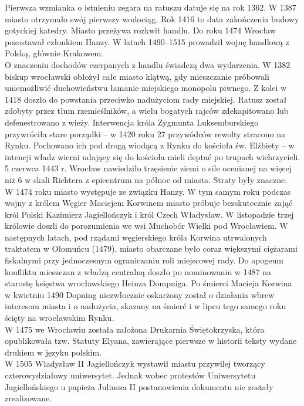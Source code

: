 \documentclass{article}
\begin{document}
Pierwsza wzmianka o istnieniu zegara na ratuszu datuje się na rok 1362. W 1387 miasto otrzymało swój pierwszy wodociąg. Rok 1416 to data zakończenia budowy gotyckiej katedry. Miasto przeżywa rozkwit handlu. Do roku 1474 Wrocław pozostawał członkiem Hanzy. W latach 1490–1515 prowadził wojnę handlową z Polską, głównie Krakowem.\\
O znaczeniu dochodów czerpanych z handlu świadczą dwa wydarzenia. W 1382 biskup wrocławski obłożył całe miasto klątwą, gdy mieszczanie próbowali uniemożliwić duchowieństwu łamanie miejskiego monopolu piwnego. Z kolei w 1418 doszło do powstania przeciwko nadużyciom rady miejskiej. Ratusz został zdobyty przez tłum rzemieślników, a wielu bogatych rajców zdekapitowano lub defenestrowano z wieży. Interwencja króla Zygmunta Luksemburskiego przywróciła stare porządki – w 1420 roku 27 przywódców rewolty stracono na Rynku. Pochowano ich pod drogą wiodącą z Rynku do kościoła św. Elżbiety – w intencji władz wierni udający się do kościoła mieli deptać po trupach wichrzycieli.\\
5 czerwca 1443 r. Wrocław nawiedziło trzęsienie ziemi o sile ocenianej na więcej niż 6 w skali Richtera z epicentrum na północ od miasta. Straty były znaczne.\\
W 1474 roku miasto występuje ze związku Hanzy. W tym samym roku podczas wojny z królem Węgier Maciejem Korwinem miasto próbuje bezskutecznie zająć król Polski Kazimierz Jagiellończyk i król Czech Władysław. W listopadzie trzej królowie doszli do porozumienia we wsi Muchobór Wielki pod Wrocławiem. W następnych latach, pod rządami węgierskiego króla Korwina utrwalonych traktatem w Ołomuńcu (1479), miasto obarczane było coraz większymi ciężarami fiskalnymi przy jednoczesnym ograniczaniu roli miejscowej rady. Do apogeum konfliktu mieszczan z władzą centralną doszło po nominowaniu w 1487 na starostę księstwa wrocławskiego Heinza Dompniga. Po śmierci Macieja Korwina w kwietniu 1490 Dopning niezwłocznie oskarżony został o działania wbrew interesom miasta i o nadużycia, skazany na śmierć i w lipcu tego samego roku ścięty na wrocławskim Rynku.\\
W 1475 we Wrocławiu została założona Drukarnia Świętokrzyska, która opublikowała tzw. Statuty Elyana, zawierające pierwsze w historii teksty wydane drukiem w języku polskim.\\
W 1505 Władysław II Jagiellończyk wystawił miastu przywilej tworzący czterowydziałowy uniwersytet. Jednak wobec protestów Uniwersytetu Jagiellońskiego u papieża Juliusza II postanowienia dokumentu nie zostały zrealizowane.\\
\end{document}
